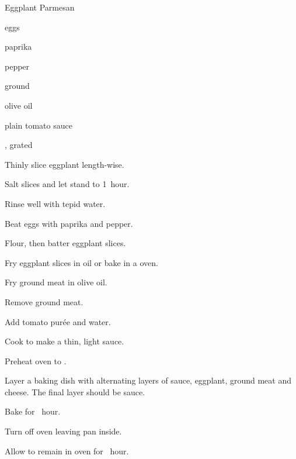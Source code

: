 \begin{recipe}{Eggplant Parmesan\FIXME}{}{}

\begin{ingredients}
\item {}
\item eggs
\item paprika
\item pepper
\item ground 
\item olive oil
\item plain tomato sauce
\item {}, grated 
\end{ingredients}

\begin{directions}
\item Thinly slice eggplant length-wise.
\item Salt slices and let stand \half{} to 1~hour.
\item Rinse well with tepid water.
\item Beat eggs with paprika and pepper.
\item Flour, then batter eggplant slices.
\item Fry eggplant slices in oil or bake in a  oven.
\item Fry ground meat in olive oil.
\item Remove ground meat.
\item Add tomato pur\'ee and water.
\item Cook to make a thin, light sauce.
\item Preheat oven to .
\item Layer a baking dish with alternating layers of sauce, eggplant, ground meat and cheese. The final layer should be sauce.
\item Bake for \half~hour.
\item Turn off oven leaving pan inside.
\item Allow to remain in oven for \half~hour.
\end{directions}

\end{recipe}
